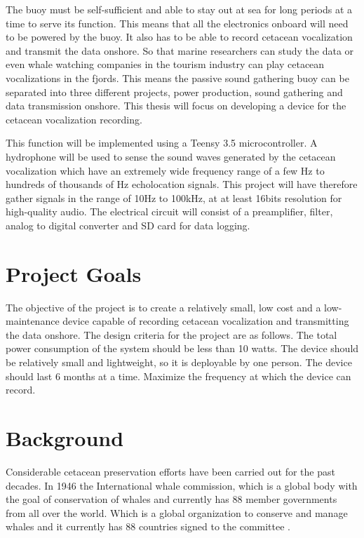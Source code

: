 The buoy must be self-sufficient and able to stay out at sea for long periods at a time to serve its function.
This means that all the electronics onboard will need to be powered by the buoy.
It also has to be able to record cetacean vocalization and transmit the data onshore.
So that marine researchers can study the data or even whale watching companies in the tourism industry can play cetacean vocalizations in the fjords.
This means the passive sound gathering buoy can be separated into three different projects, power production, sound gathering and data transmission onshore.
This thesis will focus on developing a device for the cetacean vocalization recording.

This function will be implemented using a Teensy 3.5 microcontroller.
A hydrophone will be used to sense the sound waves generated by the cetacean vocalization which have an extremely wide frequency range of a few Hz to hundreds of thousands of Hz echolocation signals. This project will have therefore gather signals in the range of 10Hz to 100kHz, at at least 16bits resolution for high-quality audio.
The electrical circuit will consist of a preamplifier, filter, analog to digital converter and SD card for data logging.





\section{Project Goals}

The objective of the project is to create a relatively small, low cost and a low-maintenance device capable of recording cetacean vocalization and transmitting the data onshore.
The design criteria for the project are as follows.
The total power consumption of the system should be less than 10 watts. 
The device should be relatively small and lightweight, so it is deployable by one person.
The device should last 6 months at a time.
Maximize the frequency at which the device can record.
\clearpage

\section{Background}

Considerable cetacean preservation efforts have been carried out for the past decades.
In 1946 the International whale commission, which is a global body with the goal of conservation of whales and currently has 88 member governments from all over the world.
Which is a global organization to conserve and manage whales and it currently has 88 countries signed to the committee \cite{noauthor_iwc_nodate}.

